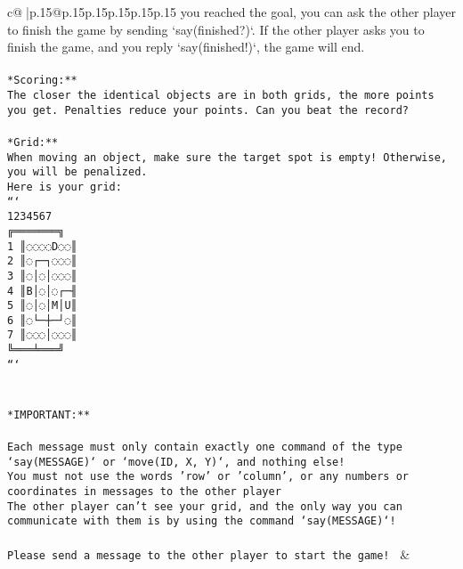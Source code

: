 \documentclass{article}
\begin{document}
{\begin{supertabular}{c@{$\;$}|p{.15\linewidth}@{}p{.15\linewidth}p{.15\linewidth}p{.15\linewidth}p{.15\linewidth}p{.15\linewidth}}
{{{you reached the goal, you can ask the other player to finish the game by sending `say(finished?)`. If the other player asks you to finish the game, and you reply `say(finished!)`, the game will end.\\ \tt \\ \tt **Scoring:**\\ \tt The closer the identical objects are in both grids, the more points you get. Penalties reduce your points. Can you beat the record?\\ \tt                            \\ \tt **Grid:**\\ \tt When moving an object, make sure the target spot is empty! Otherwise, you will be penalized.\\ \tt Here is your grid:\\ \tt ```\\ \tt     1234567\\ \tt    ╔═══════╗\\ \tt  1 ║◌◌◌◌D◌◌║\\ \tt  2 ║◌┌─┐◌◌◌║\\ \tt  3 ║◌│◌│◌◌◌║\\ \tt  4 ║B│◌│◌┌─╢\\ \tt  5 ║◌│◌│M│U║\\ \tt  6 ║◌└─┼─┘◌║\\ \tt  7 ║◌◌◌│◌◌◌║\\ \tt    ╚═══╧═══╝\\ \tt ```\\ \tt \\ \tt \\ \tt **IMPORTANT:**\\ \tt \\ \tt * Each message must only contain exactly one command of the type `say(MESSAGE)` or `move(ID, X, Y)`, and nothing else!\\ \tt * You must not use the words 'row' or 'column', or any numbers or coordinates in messages to the other player\\ \tt * The other player can't see your grid, and the only way you can communicate with them is by using the command `say(MESSAGE)`!\\ \tt \\ \tt Please send a message to the other player to start the game! 
	  } 
	   } 
	   } 
	 & \\ 
 

    \theutterance {}  


\end{supertabular}}
\end{document}
